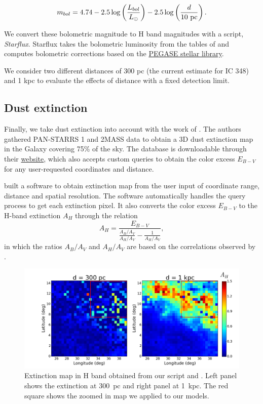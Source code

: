 \begin{equation}
m_{bol} = 4.74- 2.5 \log\left(\frac{L_{bol}}{L_\odot}\right) - 2.5\log\left( \frac{d}{10~{\textrm{pc}}}\right).
\end{equation}




We convert these bolometric magnitude to H band magnitudes with a script, \textit{Starflux}. Starflux takes the bolometric luminosity from the tables of \cite{Hurley2000} and computes bolometric corrections based on the \href{http://www2.iap.fr/pegase/pegasehr/#codes}{PEGASE stellar library}.


 We consider two different distances of 300 pc (the current estimate for IC 348) and 1 kpc to evaluate the effects of distance with a fixed detection limit.

\subsection*{Dust extinction}

Finally, we take dust extinction into account with the work of \cite{Green2015}. The authors gathered PAN-STARRS 1 and 2MASS data to obtain a 3D dust extinction map in the Galaxy covering 75\% of the sky. The database is downloadable through their \href{http://argonaut.skymaps.info/}{website}, which also accepts custom queries to obtain the color excess $E_{B-V}$ for any user-requested coordinates and distance.

\cite{Niederkorn2016} built a software to obtain extinction map from the user input of coordinate range, distance and spatial resolution. The software automatically handles the query process to get each extinction pixel. It also converts the color excess $E_{B-V}$ to the H-band extinction $A_H$ through the relation
\begin{equation}
A_H =   \frac{E_{B-V}}{ \frac{A_B/A_V}{A_H/A_V} - \frac{1}{A_H/A_V} },
\end{equation}
in which the ratios $A_B/A_V$ and $A_H/A_V$ are based on the correlations observed by \cite{Cardelli1989}. 


\begin{figure}
\begin{center}
\includegraphics[width=\textwidth]{Figures/7_dustmaps.png}
\end{center}
\caption[Extinction map in H band for selected coordinates]{Extinction map in H band obtained from our script and \cite{Green2015}. Left panel shows the extinction at 300~pc and right panel at 1~kpc. The red square shows the zoomed in map we applied to our models.}
\label{Fig:7_dustmaps}
\end{figure} 

